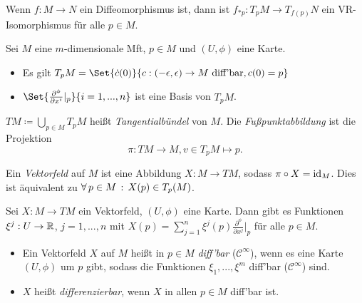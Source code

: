\documentclass{cheat-sheet}
\newcommand{\coord}[1]{\tfrac{\partial^\phi}{\partial x^{#1}}} %
\begin{document}
\begin{kor}
  Wenn $f : M \to N$ ein Diffeomorphismus ist, dann ist $f_{*p} : T_p M \to T_{f(p)} N$ ein VR-Isomorphismus für alle $p \in M$.
\end{kor}

\begin{satz}
  Sei $M$ eine $m$-dimensionale Mft, $p \in M$ und $(U, \phi)$ eine Karte.
  \begin{itemize}
    \item Es gilt $T_p M = \Set{ \dot{c}(0) }{ c : \ointerval{-\epsilon}{\epsilon} \to M \text{ diff'bar}, c(0) = p }$
    \item $\Set{\coord{i}|_p}{i=1,...,n}$ ist eine Basis von $T_p M$.
  \end{itemize}
\end{satz}

\begin{defn}
  $TM \coloneqq \bigcup_{p \in M} T_p M$ heißt \emph{Tangentialbündel} von $M$. Die \emph{Fußpunktabbildung} ist die Projektion
  \[ \pi : TM \to M, v \in T_p M \mapsto p. \]
\end{defn}


\begin{defn}
  Ein \emph{Vektorfeld} auf $M$ ist eine Abbildung $X : M \to TM$, sodass $\pi \circ X = \mathrm{id}_M$. Dies ist äquivalent zu $\forall \, {p \in M} \,:\, X(p) \in T_p(M)$.
\end{defn}

\begin{bem}
  Sei $X : M \to TM$ ein Vektorfeld, $(U, \phi)$ eine Karte. Dann gibt es Funktionen $\xi^j : U \to \mathbb{R}$, $j = 1, ..., n$ mit $X(p) = \sum_{j=1}^n \xi^j(p) \coord{j}|_p$ für alle $p \in M$.
\end{bem}

\begin{defn}
  \begin{itemize}
    \item Ein Vektorfeld $X$ auf $M$ heißt in $p \in M$ \emph{diff'bar} ($\mathcal{C}^\infty$), wenn es eine Karte $(U, \phi)$ um $p$ gibt, sodass die Funktionen $\xi_1, ..., \xi^m$ diff'bar ($\mathcal{C}^\infty$) sind.
    \item $X$ heißt \emph{differenzierbar}, wenn $X$ in allen $p \in M$ diff'bar ist.
  \end{itemize}
\end{defn}
\end{document}

